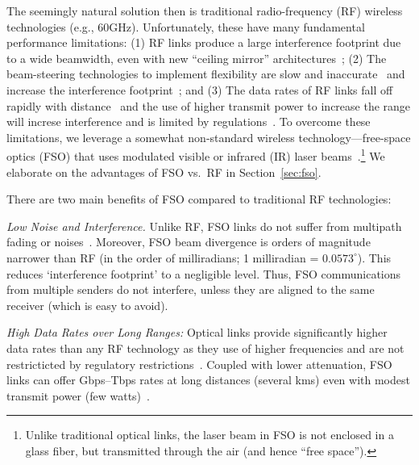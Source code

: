 

 The seemingly natural  solution then is 
 traditional radio-frequency (RF) wireless technologies (e.g., 60GHz).
Unfortunately, these  have  many fundamental performance 
limitations: (1)  RF links produce a
large interference footprint due to a wide beamwidth, even with new ``ceiling
mirror'' architectures~\cite{3db};   (2) The beam-steering  technologies
 to implement flexibility are  slow and
inaccurate~\cite{3db} and increase the interference
footprint~\cite{phased-arrays-rf};  
and (3) The data rates of RF links fall off
rapidly with distance~\cite{3db} and the use 
 of  higher transmit power to increase the range 
 will increse interference and is limited by regulations~\cite{}.
To overcome these limitations, we leverage a somewhat non-standard wireless 
technology---free-space optics (FSO) that uses modulated visible or
infrared (IR) laser beams~\cite{kedar}.\footnote{Unlike traditional optical
links, the laser beam in FSO is not enclosed in a glass fiber, but transmitted
through the air (and hence  ``free space'').}  
 We elaborate on the advantages of FSO vs.\ RF in Section~\ref{sec:fso}.

\eat
{
There are two main benefits of FSO
compared to traditional RF technologies: 
%
\begin{packeditemize} \item {\em Low Noise and Interference.}  Unlike RF,
FSO links do not suffer from multipath fading or  noises~\cite{}.
Moreover, FSO beam divergence is  orders of magnitude narrower than RF
 (in the order of milliradians; 1 milliradian = $0.0573^\circ$). This
reduces `interference footprint' to a negligible level.  Thus, FSO
communications from multiple senders do not interfere, unless they are aligned
to the same receiver (which is easy to avoid).

 \item   {\em High Data Rates over Long Ranges:}  Optical links 
 provide significantly higher data rates than any  RF
technology as they use of  higher frequencies and are not restricticted by 
regulatory restrictions~\cite{kedar}. Coupled with  lower
attenuation, FSO links can offer Gbps--Tbps rates at long distances (several kms) even
with modest transmit power (few watts)~\cite{kedar,fsona,mustafa2013reintroducing}.

\end{packeditemize}
}


